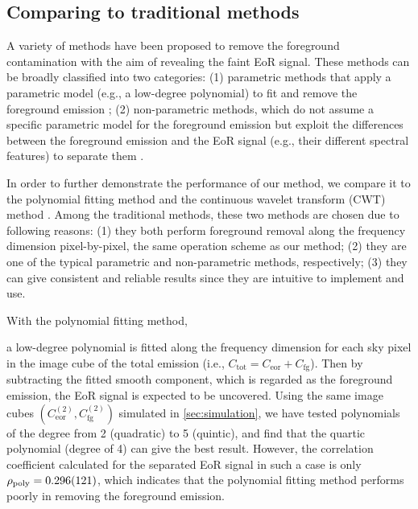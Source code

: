 \documentclass[fleqn,usenatbib]{mnras}
\newcommand{\R}[1]{\mathrm{#1}}
\newcommand{\editwip}[1]{{\leavevmode\color{magenta}#1}}
\begin{document}
\editwip{%
\subsection{Comparing to traditional methods}
\label{sec:comparisons}

A variety of methods have been proposed to remove the foreground
contamination with the aim of revealing the faint EoR signal.
These methods can be broadly classified into two categories:
(1) parametric methods that apply a parametric model (e.g., a low-degree
polynomial) to fit and remove the foreground emission
\citep[e.g.,][]{wang2006,liu2009fgrm,wang2013};
(2) non-parametric methods, which do not assume a specific parametric model
for the foreground emission but exploit the differences between the
foreground emission and the EoR signal (e.g., their different spectral
features) to separate them
\citep[e.g.,][]{harker2009,gu2013,chapman2013,mertens2018}.

In order to further demonstrate the performance of our method, we compare
it to the polynomial fitting method \citep[e.g.,][]{wang2006} and the
continuous wavelet transform (CWT) method \citep{gu2013}.
Among the traditional methods, these two methods are chosen due to
following reasons:
(1) they both perform foreground removal along the frequency dimension
pixel-by-pixel, the same operation scheme as our method;
(2) they are one of the typical parametric and non-parametric methods,
respectively;
(3) they can give consistent and reliable results since they are intuitive
to implement and use.

With the polynomial fitting method,} %
a low-degree polynomial is fitted along the frequency dimension for each
sky pixel in the image cube of the total emission (i.e.,
$C_{\R{tot}} = C_{\R{eor}} + C_{\R{fg}}$).
Then by subtracting the fitted smooth component, which is regarded as
the foreground emission, the EoR signal is expected to be uncovered.
\editwip{Using the same image cubes
\editwip{$\left( C_{\R{eor}}^{(2)}, C_{\R{fg}}^{(2)} \right)$}
simulated in \autoref{sec:simulation},} %
we have tested polynomials of the degree from 2 (quadratic) to
5 (quintic), and find that the quartic polynomial (degree of 4)
can give the best result.
However, the correlation coefficient calculated for the separated EoR
signal in such a case is only
\editwip{$\rho_{\R{poly}} = \num{0.296 +- 0.121}$},
which indicates that the polynomial fitting method performs poorly in
removing the foreground emission.
\end{document}
